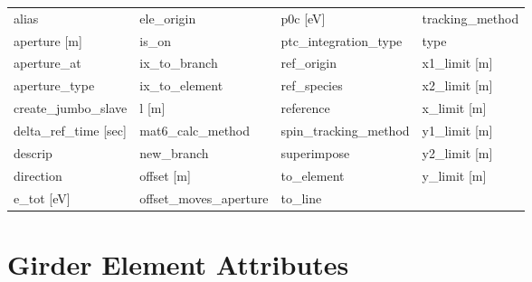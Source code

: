  \begin{tabular}{llll} \toprule
alias                            & ele_origin                       & p0c [eV]                         & tracking_method                  \\
aperture [m]                     & is_on                            & ptc_integration_type             & type                             \\
aperture_at                      & ix_to_branch                     & ref_origin                       & x1_limit [m]                     \\
aperture_type                    & ix_to_element                    & ref_species                      & x2_limit [m]                     \\
create_jumbo_slave               & l [m]                            & reference                        & x_limit [m]                      \\
delta_ref_time [sec]             & mat6_calc_method                 & spin_tracking_method             & y1_limit [m]                     \\
descrip                          & new_branch                       & superimpose                      & y2_limit [m]                     \\
direction                        & offset [m]                       & to_element                       & y_limit [m]                      \\
e_tot [eV]                       & offset_moves_aperture            & to_line                          &                                  \\
 \bottomrule
 \end{tabular}
 \vfill
 
 \section{Girder Element Attributes}
 \label{s:list.girder}
 
